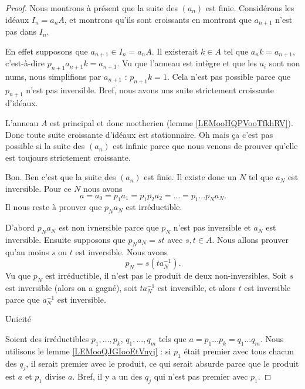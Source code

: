 \begin{proof}
	Nous montrons à présent que la suite des \( (a_n)\) est finie. Considérons les idéaux \( I_n=a_nA\), et montrons qu'ils sont croissants en montrant que \( a_{n+1}\) n'est pas dans \( I_n\).

	En effet supposons que \( a_{n+1}\in I_n=a_nA\). Il existerait \( k\in A\) tel que \( a_nk=a_{n+1}\), c'est-à-dire \( p_{n+1}a_{n+1}k=a_{n+1}\). Vu que l'anneau est intègre et que les \( a_i\) sont non nums, nous simplifions par \( a_{n+1}\) : \( p_{n+1}k=1\). Cela n'est pas possible parce que \( p_{n+1}\) n'est pas inversible. Bref, nous avons uns suite strictement croissante d'idéaux.

	L'anneau \( A\) est principal et donc noetherien (lemme \ref{LEMooHQPVooTfkhRV}). Donc toute suite croissante d'idéaux est stationnaire. Oh mais ça c'est pas possible si la suite des \( (a_n)\) est infinie parce que nous venons de prouver qu'elle est toujours strictement croissante.

	Bon. Ben c'est que la suite des \( (a_n)\) est finie. Il existe donc un \( N\) tel que \( a_N\) est inversible. Pour ce \( N\) nous avons
	\begin{equation}
		a=a_0=p_1a_1=p_1p_2a_2=\ldots =p_1\ldots p_Na_N.
	\end{equation}
	Il nous reste à prouver que \( p_Na_N\) est irréductible.

	D'abord \( p_Na_N\) est non ivnersible parce que \( p_N\) n'est pas inversible et \( a_N\) est inversible. Ensuite supposons que \( p_Na_N=st\) avec \( s,t\in A\). Nous allons prouver qu'au moins \( s\) ou \( t\) est inversible. Nous avons
	\begin{equation}
		p_N=s(ta_N^{-1}).
	\end{equation}
	Vu que \( p_N\) est irréductible, il n'est pas le produit de deux non-inversibles. Soit \( s\) est inversible (alors on a gagné), soit \( ta_N^{-1}\) est inversible, et alors \( t\) est inversible parce que \( a_N^{-1}\) est inversible.

	\begin{proofpart}
		Unicité
	\end{proofpart}

	Soient des irréductibles \( p_1,\ldots,p_k\), \( q_1,\ldots,q_m\) tels que \( a=p_1\ldots p_k=q_1\ldots q_m\). Nous utilisons le lemme \ref{LEMooQJGIooEtVnyj} : si \( p_1\) était premier avec tous chacun des \( q_j\), il serait premier avec le produit, ce qui serait absurde parce que le produit est \( a\) et \( p_1\) divise \( a\). Bref, il y a un des \( q_j\) qui n'est pas premier avec \( p_1\).


\end{proof}
